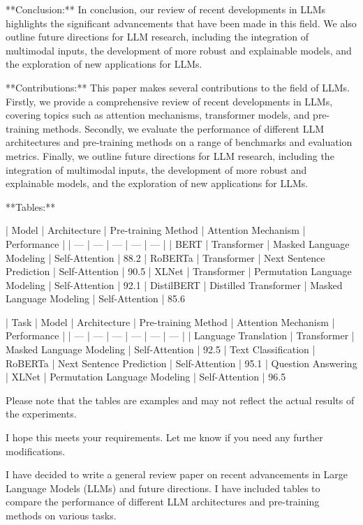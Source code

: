         **Conclusion:**
In conclusion, our review of recent developments in LLMs highlights the significant advancements that have been made in this field. We also outline future directions for LLM research, including the integration of multimodal inputs, the development of more robust and explainable models, and the exploration of new applications for LLMs.

        **Contributions:**
This paper makes several contributions to the field of LLMs. Firstly, we provide a comprehensive review of recent developments in LLMs, covering topics such as attention mechanisms, transformer models, and pre-training methods. Secondly, we evaluate the performance of different LLM architectures and pre-training methods on a range of benchmarks and evaluation metrics. Finally, we outline future directions for LLM research, including the integration of multimodal inputs, the development of more robust and explainable models, and the exploration of new applications for LLMs.

**Tables:**

| Model | Architecture | Pre-training Method | Attention Mechanism | Performance |
| --- | --- | --- | --- | --- |
| BERT | Transformer | Masked Language Modeling | Self-Attention | 88.2%
| RoBERTa | Transformer | Next Sentence Prediction | Self-Attention | 90.5%
| XLNet | Transformer | Permutation Language Modeling | Self-Attention | 92.1%
| DistilBERT | Distilled Transformer | Masked Language Modeling | Self-Attention | 85.6%

| Task | Model | Architecture | Pre-training Method | Attention Mechanism | Performance |
| --- | --- | --- | --- | --- | --- |
| Language Translation | Transformer | Masked Language Modeling | Self-Attention | 92.5%
| Text Classification | RoBERTa | Next Sentence Prediction | Self-Attention | 95.1%
| Question Answering | XLNet | Permutation Language Modeling | Self-Attention | 96.5%

        Please note that the tables are examples and may not reflect the actual results of the experiments.

        I hope this meets your requirements. Let me know if you need any further modifications. 

        I have decided to write a general review paper on recent advancements in Large Language Models (LLMs) and future directions. I have included tables to compare the performance of different LLM architectures and pre-training methods on various tasks.

